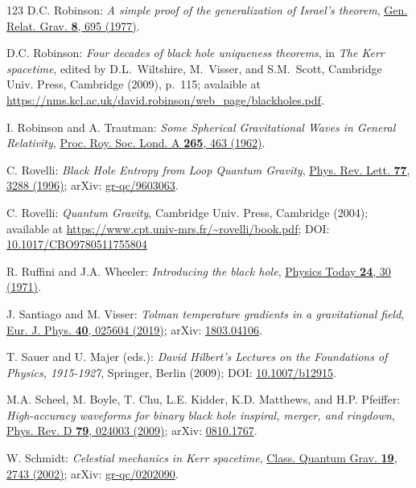 \begin{thebibliography}{123}
D.C. Robinson:
{\em A simple proof of the generalization of Israel's theorem},
\href{https://doi.org/10.1007/BF00756322}{Gen. Relat. Grav. {\bf 8}, 695 (1977)}.

D.C. Robinson:
{\em Four decades of black hole uniqueness theorems},
in {\em The Kerr spacetime}, edited by D.L.~Wiltshire, M.~Visser, and S.M.~Scott,
Cambridge Univ. Press, Cambridge (2009), p.~115; avalaible at
\url{https://nms.kcl.ac.uk/david.robinson/web_page/blackholes.pdf}.

I. Robinson and A. Trautman:
{\em Some Spherical Gravitational Waves in General Relativity},
\href{https://doi.org/10.1098/rspa.1962.0036}{Proc. Roy. Soc. Lond. A {\bf 265}, 463 (1962)}.

C. Rovelli:
{\em Black Hole Entropy from Loop Quantum Gravity},
\href{https://doi.org/10.1103/PhysRevLett.77.3288}{Phys. Rev. Lett. {\bf 77}, 3288 (1996)};
arXiv: \href{https://arxiv.org/abs/gr-qc/9603063}{gr-qc/9603063}.

C. Rovelli:
{\em Quantum Gravity},
Cambridge Univ. Press, Cambridge (2004); available at
\url{https://www.cpt.univ-mrs.fr/~rovelli/book.pdf};
DOI: \href{https://doi.org/10.1017/CBO9780511755804}{10.1017/CBO9780511755804}

R. Ruffini and J.A. Wheeler:
{\em Introducing the black hole},
\href{https://doi.org/10.1063/1.3022513}{Physics Today {\bf 24}, 30 (1971)}.

J. Santiago and M. Visser:
{\em Tolman temperature gradients in a gravitational field},
\href{https://doi.org/10.1088/1361-6404/aaff1c}{Eur. J. Phys. {\bf 40}, 025604 (2019)};
arXiv: \href{https://arxiv.org/abs/1803.04106}{1803.04106}.

T. Sauer and U. Majer (eds.):
{\em David Hilbert’s Lectures on the Foundations of Physics, 1915-1927},
Springer, Berlin (2009);
DOI: \href{https://doi.org/10.1007/b12915}{10.1007/b12915}.

M.A. Scheel, M. Boyle, T. Chu, L.E. Kidder, K.D. Matthews, and H.P. Pfeiffer:
{\em High-accuracy waveforms for binary black hole inspiral, merger, and ringdown},
\href{https://doi.org/10.1103/PhysRevD.79.024003}{Phys. Rev. D {\bf 79}, 024003 (2009)};
arXiv: \href{https://arxiv.org/abs/0810.1767}{0810.1767}.

W. Schmidt:
{\em Celestial mechanics in Kerr spacetime},
\href{https://doi.org/10.1088/0264-9381/19/10/314}{Class. Quantum Grav. {\bf 19}, 2743 (2002)};
arXiv: \href{https://arxiv.org/abs/gr-qc/0202090}{gr-qc/0202090}.


\end{thebibliography}
